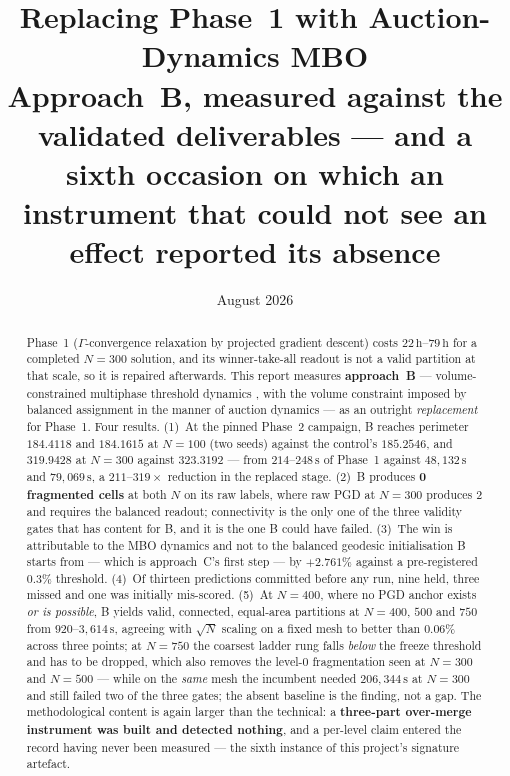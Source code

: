 \documentclass[11pt,a4paper]{article}
\title{\textbf{Replacing Phase~1 with Auction-Dynamics MBO}\\[0.5em]
  \large Approach~B, measured against the validated deliverables --- and a sixth
  occasion on which an instrument that could not see an effect reported its absence}
\author{}
\date{August 2026}
\begin{document}
\maketitle

\begin{abstract}
Phase~1 ($\Gamma$-convergence relaxation by projected gradient descent) costs
\(22\,\mathrm{h}\)--\(79\,\mathrm{h}\) for a completed \(N{=}300\) solution, and its
winner-take-all readout is not a valid partition at that scale, so it is repaired
afterwards. This report measures \textbf{approach~B} --- volume-constrained
multiphase threshold dynamics \cite{merriman1994motion, esedoglu2015threshold},
with the volume constraint imposed by balanced assignment in the manner of auction
dynamics \cite{jacobs2018auction} --- as an outright \emph{replacement} for
Phase~1. Four results. (1)~At the pinned Phase~2 campaign, B reaches perimeter
\(\mathbf{184.4118}\) and \(\mathbf{184.1615}\) at \(N{=}100\) (two seeds) against
the control's \(185.2546\), and \(\mathbf{319.9428}\) at \(N{=}300\) against
\(323.3192\) --- from \(214\text{--}248\,\mathrm{s}\) of Phase~1 against
\(48{,}132\,\mathrm{s}\) and \(79{,}069\,\mathrm{s}\), a \(211\text{--}319\times\) reduction
in the replaced stage. (2)~B produces \textbf{0 fragmented cells} at both \(N\) on
its raw labels, where raw PGD at \(N{=}300\) produces 2 and requires the balanced
readout; connectivity is the only one of the three validity gates that has content
for B, and it is the one B could have failed. (3)~The win is attributable to the
MBO dynamics and not to the balanced geodesic initialisation B starts from ---
which is approach~C's first step --- by \(+2.761\%\) against a pre-registered
\(0.3\%\) threshold. (4)~Of thirteen predictions committed before any run, nine
held, three missed and one was initially mis-scored. (5)~At \(N{=}400\), where no
PGD anchor exists \emph{or is possible}, B yields valid, connected, equal-area
partitions at \(N{=}400\), \(500\) and \(750\) from \(920\text{--}3{,}614\,\mathrm{s}\),
agreeing with \(\sqrt{N}\) scaling on a fixed mesh to better than \(0.06\%\)
across three points; at \(N{=}750\) the coarsest ladder rung falls \emph{below}
the freeze threshold and has to be dropped, which also removes the level-0
fragmentation seen at \(N{=}300\) and \(N{=}500\) --- while on the \emph{same} mesh the
incumbent needed \(206{,}344\,\mathrm{s}\) at \(N{=}300\) and still failed two
of the three gates; the absent baseline is the finding, not a gap. The methodological content is
again larger than the technical: a \textbf{three-part over-merge instrument was
built and detected nothing}, and a per-level claim entered the record having never
been measured --- the sixth instance of this project's signature artefact.
\end{abstract}
\end{document}
